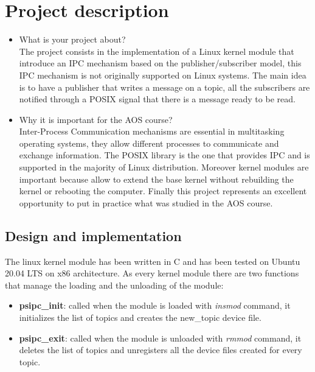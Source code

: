 \documentclass[10pt,a4]{article}
\begin{document}
\section{Project description}

\begin{itemize}
\item What is your project about?\\
The project consists in the implementation of a Linux kernel module that introduce an IPC mechanism based on the publisher/subscriber model, 
this IPC mechanism is not originally supported on Linux systems.
The main idea is to have a publisher that writes a message on a topic, all the subscribers are notified through a POSIX signal that there is a message ready to be read.

\item Why it is important for the AOS course?\\
Inter-Process Communication mechanisms are essential in multitasking operating systems, they allow different processes to communicate and exchange information.
The POSIX library is the one that provides IPC and is supported in the majority of Linux distribution.
Moreover kernel modules are important because allow to extend the base kernel without rebuilding the kernel or rebooting the computer.
Finally this project represents an excellent opportunity to put in practice what was studied in the AOS course.
\end{itemize}

\subsection{Design and implementation}
The linux kernel module has been written in C and has been tested on Ubuntu 20.04 LTS on x86 architecture.
As every kernel module there are two functions that manage the loading and the unloading of the module:

\begin{itemize}
  \item \textbf{psipc\_init}: called when the module is loaded with \textit{insmod} command, it initializes the list of topics and creates the new\_topic device file.
  \item \textbf{psipc\_exit}: called when the module is unloaded with \textit{rmmod} command, it deletes the list of topics and unregisters all the device files created for every topic.
\end{itemize}
\end{document}
